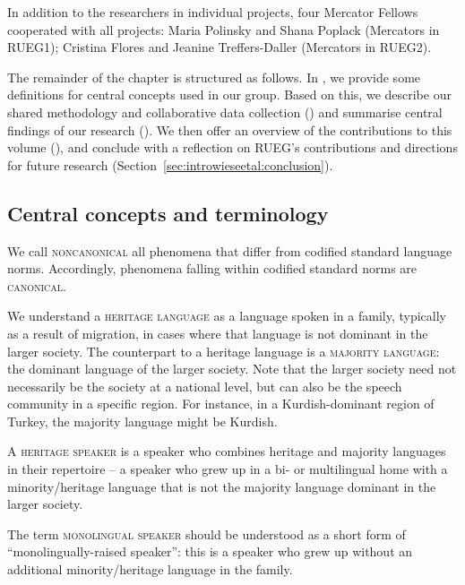 \documentclass[output=paper,colorlinks,citecolor=brown]{langscibook}
\begin{document}
In addition to the researchers in individual projects, four Mercator Fellows cooperated with all projects: Maria Polinsky and Shana Poplack (Mercators in RUEG1); Cristina Flores and Jeanine Treffers-Daller (Mercators in RUEG2).

The remainder of the chapter is structured as follows. In , we provide some definitions for central concepts used in our group. Based on this, we describe our shared methodology and collaborative data collection () and summarise central findings of our research (). We then offer an overview of the contributions to this volume (), and conclude with a reflection on RUEG’s contributions and directions for future research (Section~\ref{sec:introwieseetal:conclusion}).

\subsection{Central concepts and terminology} \label{sec:introwieseetal:terminology}

We call \textsc{noncanonical} all phenomena that differ from codified standard language norms. Accordingly, phenomena falling within codified standard norms are \textsc{canonical}.

We understand a \textsc{heritage} \textsc{language} as a language spoken in a family, typically as a result of migration, in cases where that language is not dominant in the larger society. The counterpart to a heritage language is a \textsc{majority} \textsc{language}: the dominant language of the larger society. Note that the larger society need not necessarily be the society at a national level, but can also be the speech community in a specific region. For instance, in a Kurdish-dominant region of Turkey, the majority language might be Kurdish.

A \textsc{heritage} \textsc{speaker} is a speaker who combines heritage and majority languages in their repertoire – a speaker who grew up in a bi- or multilingual home with a minority/heritage language that is not the majority language dominant in the larger society.

The term \textsc{monolingual} \textsc{speaker} should be understood as a short form of “monolingually\hyp raised speaker”: this is a speaker who grew up without an additional minority/heritage language in the family.
\end{document}
